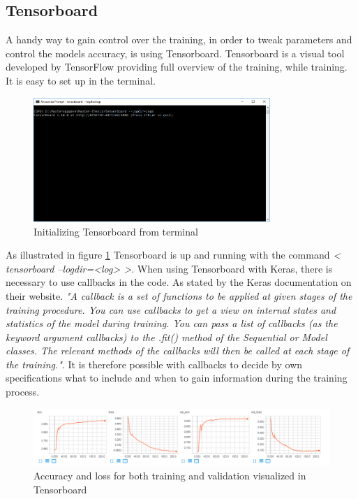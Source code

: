 \documentclass[USenglish]{ifimaster}  %
\begin{document}
\subsection{Tensorboard}
A handy way to gain control over the training, in order to tweak parameters and control the models accuracy, is using Tensorboard. Tensorboard is a visual tool developed by TensorFlow providing full overview of the training, while training. It is easy to set up in the terminal.
\begin{figure}[ht]
    \centering
    \includegraphics[width=0.8\textwidth]{bilder/tensorboard_anaconda_prompt.PNG}
    \caption{Initializing Tensorboard from terminal}
    \label{fig:tensorboard_anaconda_prompt}
\end{figure}
\newline
As illustrated in figure \cref{fig:tensorboard_anaconda_prompt} Tensorboard is up and running with the command \textit{< tensorboard --logdir=<log> >}. 
\newline
When using Tensorboard with Keras, there is necessary to use callbacks in the code. As stated by the Keras documentation on their website.
\newline
\newline
\textit{"A callback is a set of functions to be applied at given stages of the training procedure. You can use callbacks to get a view on internal states and statistics of the model during training. You can pass a list of callbacks (as the keyword argument callbacks) to the .fit() method of the Sequential or Model classes. The relevant methods of the callbacks will then be called at each stage of the training."}\cite{website:Keras_doc}. 
\newline
\newline
It is therefore possible with callbacks to decide by own specifications what to include and when to gain information during the training process.  
\begin{figure}[ht]
    \centering
    \includegraphics[width=1\textwidth]{bilder/tensorboard_acc_loss.PNG}
    \caption{Accuracy and loss for both training and validation visualized in Tensorboard}
    \label{fig:accuracy_loss}
\end{figure}
\end{document}
